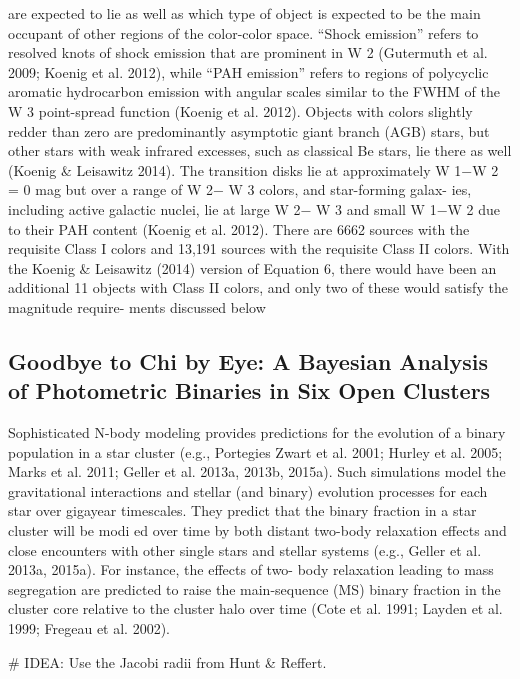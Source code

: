 \documentclass[../main.tex]{subfiles}
\begin{document}
{are expected to lie as well as which type of object is expected
to be the main occupant of other regions of the color-color
space. “Shock emission” refers to resolved knots of shock
emission that are prominent in W 2 (Gutermuth et al. 2009;
Koenig et al. 2012), while “PAH emission” refers to regions
of polycyclic aromatic hydrocarbon emission with angular
scales similar to the FWHM of the W 3 point-spread function
(Koenig et al. 2012). Objects with colors slightly redder than
zero are predominantly asymptotic giant branch (AGB) stars,
but other stars with weak infrared excesses, such as classical
Be stars, lie there as well (Koenig & Leisawitz 2014). The
transition disks lie at approximately W 1−W 2 = 0 mag but
over a range of W 2− W 3 colors, and star-forming galax-
ies, including active galactic nuclei, lie at large W 2− W 3
and small W 1−W 2 due to their PAH content (Koenig et al.
2012).
There are 6662 sources with the requisite Class I colors
and 13,191 sources with the requisite Class II colors. With
the Koenig & Leisawitz (2014) version of Equation 6, there
would have been an additional 11 objects with Class II colors,
and only two of these would satisfy the magnitude require-
ments discussed below}
\subsection{Goodbye to Chi by Eye: A Bayesian Analysis of Photometric Binaries in Six Open Clusters}

Sophisticated N-body modeling provides predictions for the
evolution of a binary population in a star cluster (e.g., Portegies
Zwart et al. 2001; Hurley et al. 2005; Marks et al. 2011; Geller
et al. 2013a, 2013b, 2015a). Such simulations model the
gravitational interactions and stellar (and binary) evolution
processes for each star over gigayear timescales. They predict
that the binary fraction in a star cluster will be modi ed over
time by both distant two-body relaxation effects and close
encounters with other single stars and stellar systems (e.g.,
Geller et al. 2013a, 2015a). For instance, the effects of two-
body relaxation leading to mass segregation are predicted to
raise the main-sequence (MS) binary fraction in the cluster core relative to the cluster halo over time (Cote et al. 1991; Layden
et al. 1999; Fregeau et al. 2002).


# IDEA: Use the Jacobi radii from Hunt & Reffert.
\end{document}

